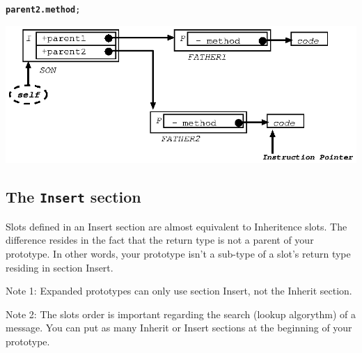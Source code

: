 \documentclass[11pt]{mybook}
\begin{document}
{\tt{}{\bf{}parent2.method};}
\begin{center}
\includegraphics[scale=1.0]{figures/resend2}
\end{center}

\subsection{The {\tt{}Insert} section }
\label{language_reference:section_identifiers:insert_section}

Slots defined in an Insert section are almost equivalent to Inheritence slots.
The difference resides in the fact that the return type is not a parent of your
prototype. In other words, your prototype isn't a sub-type of a slot's return type
residing in section Insert.

Note 1: Expanded prototypes can only use section Insert, not the Inherit section.

Note 2: The slots order is important regarding the search (lookup algorythm) of a message. 
You can put as many Inherit or Insert sections at the beginning of your prototype.

\end{document}
